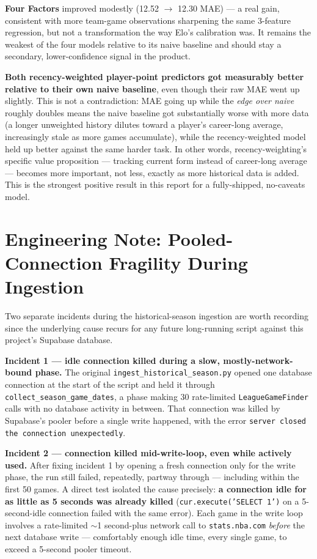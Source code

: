 \documentclass[11pt]{article}
\newcommand{\code}[1]{\allowbreak\texttt{\small #1}\allowbreak}
\begin{document}
\textbf{Four Factors} improved modestly (12.52 $\to$ 12.30 MAE) — a real gain, consistent with more team-game
observations sharpening the same 3-feature regression, but not a transformation the way Elo's calibration
was. It remains the weakest of the four models relative to its naive baseline and should stay a secondary,
lower-confidence signal in the product.

\textbf{Both recency-weighted player-point predictors got measurably better relative to their own naive
baseline}, even though their raw MAE went up slightly. This is not a contradiction: MAE going up while the
\emph{edge over naive} roughly doubles means the naive baseline got substantially worse with more data (a
longer unweighted history dilutes toward a player's career-long average, increasingly stale as more games
accumulate), while the recency-weighted model held up better against the same harder task. In other words,
recency-weighting's specific value proposition — tracking current form instead of career-long average —
becomes more important, not less, exactly as more historical data is added. This is the strongest positive
result in this report for a fully-shipped, no-caveats model.

\section{Engineering Note: Pooled-Connection Fragility During Ingestion}
\label{sec:pooler}

Two separate incidents during the historical-season ingestion are worth recording since the underlying cause
recurs for any future long-running script against this project's Supabase database.

\textbf{Incident 1 — idle connection killed during a slow, mostly-network-bound phase.} The original
\code{ingest\_historical\_season.py} opened one database connection at the start of the script and held it
through \code{collect\_season\_game\_dates}, a phase making 30 rate-limited \code{LeagueGameFinder} calls with
no database activity in between. That connection was killed by Supabase's pooler before a single write
happened, with the error \texttt{server closed the connection unexpectedly}.

\textbf{Incident 2 — connection killed mid-write-loop, even while actively used.} After fixing incident 1 by
opening a fresh connection only for the write phase, the run still failed, repeatedly, partway through —
including within the first 50 games. A direct test isolated the cause precisely: \textbf{a connection idle
for as little as 5 seconds was already killed} (\texttt{cur.execute('SELECT 1')} on a 5-second-idle connection
failed with the same error). Each game in the write loop involves a rate-limited $\sim$1 second-plus network
call to \code{stats.nba.com} \emph{before} the next database write — comfortably enough idle time, every
single game, to exceed a 5-second pooler timeout.
\end{document}
